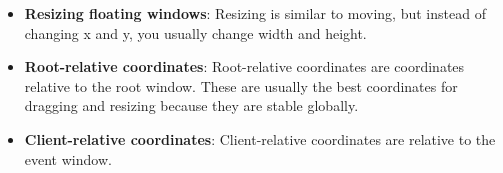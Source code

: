 \documentclass{report}
\begin{document}
\begin{itemize}
            \bigbreak \noindent 
            You usually want to move the frame window, not the raw client window, if your WM reparents clients.
            \bigbreak \noindent 
            If your WM is non-reparenting, then you move the client window directly.
        \item \textbf{Resizing floating windows}: Resizing is similar to moving, but instead of changing x and y, you usually change width and height.
        \item \textbf{Root-relative coordinates}: Root-relative coordinates are coordinates relative to the root window.
            \bigbreak \noindent 
            These are usually the best coordinates for dragging and resizing because they are stable globally.
        \item \textbf{Client-relative coordinates}: Client-relative coordinates are relative to the event window.

    \end{itemize}
\end{document}

